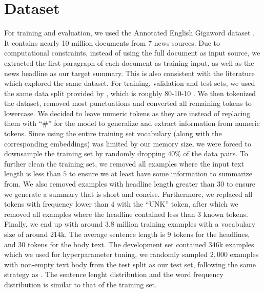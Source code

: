 \section{Dataset}
\label{sec: dataset}

For training and evaluation, we used the Annotated English Gigaword dataset \cite{graff2003english}. It contains nearly 10 million documents from 7 news sources. Due to computational constraints, instead of using the full document as input source, we extracted the first paragraph of each document as training input, as well as the news headline as our target summary. This is also consistent with the literature which explored the same dataset. For training, validation and test sets, we used the same data split provided by \cite{rush2015neural}, which is roughly 80-10-10 . We then tokenized the dataset, removed most punctuations and converted all remaining tokens to lowercase. We decided to leave numeric tokens as they are instead of replacing them with ``$\#$'' for the model to generalize and extract information from numeric tokens. Since using the entire training set vocabulary (along with the corresponding embeddings) was limited by our memory size, we were forced to downsample the training set by randomly dropping $40\%$ of the data pairs. To further clean the training set, we removed all examples where the input text length is less than $5$ to ensure we at least have some information to summarize from. We also removed examples with headline length greater than $30$ to ensure we generate a summary that is short and concise. Furthermore, we replaced all tokens with frequency lower than $4$ with the ``UNK'' token, after which we removed all examples where the headline contained less than $3$ known tokens. Finally, we end up with around $3.8$ million training examples with a vocabulary size of around $214$k. The average sentence length is $9$ tokens for the headlines, and $30$ tokens for the body text.  The development set contained $346$k examples which we used for hyperparameter tuning, we randomly sampled $2,000$ examples with non-empty text body from the test split as our test set, following the same strategy as \cite{rush2015neural}. The sentence lenght distribution and the word frequency distribution is similar to that of the training set.